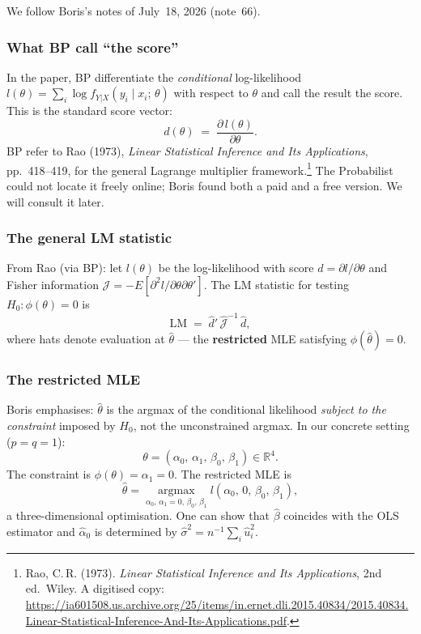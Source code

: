 \documentclass[a4paper,oneside,12pt]{extarticle}
\theoremstyle{plain}
\theoremstyle{definition}
\theoremstyle{remark}
\begin{document}
We follow Boris's notes of July~18, 2026 (note~66).

\subsubsection*{What BP call ``the score''}

In the paper, BP differentiate the \emph{conditional} log-likelihood
$l(\theta) = \sum_i \log f_{Y|X}(y_i \mid x_i;\,\theta)$ with
respect to $\theta$ and call the result the score.  This is the
standard score vector:
\[
  d(\theta) \;=\; \frac{\partial\, l(\theta)}{\partial\theta}.
\]
BP refer to Rao (1973), \emph{Linear Statistical Inference and Its
Applications}, pp.~418--419, for the general Lagrange multiplier
framework.\footnote{Rao, C.\,R. (1973). \emph{Linear Statistical
Inference and Its Applications}, 2nd ed.\ Wiley.  A digitised copy:
\url{https://ia601508.us.archive.org/25/items/in.ernet.dli.2015.40834/2015.40834.Linear-Statistical-Inference-And-Its-Applications.pdf}.}
The Probabilist could not locate it freely online; Boris found both a paid
and a free version.  We will consult it later.

\subsubsection*{The general LM statistic}

From Rao (via BP): let $l(\theta)$ be the log-likelihood with
score $d = \partial l/\partial\theta$ and Fisher information
$\mathcal{J} = -E[\partial^2 l/\partial\theta\partial\theta']$.
The LM statistic for testing $H_0: \phi(\theta) = 0$ is
\[
  \mathrm{LM} \;=\; \hat{d}'\,\hat{\mathcal{J}}^{-1}\,\hat{d},
\]
where hats denote evaluation at $\hat\theta$ — the
\textbf{restricted} MLE satisfying $\phi(\hat\theta) = 0$.

\subsubsection*{The restricted MLE}

Boris emphasises: $\hat\theta$ is the argmax of the conditional
likelihood \emph{subject to the constraint} imposed by $H_0$, not
the unconstrained argmax.  In our concrete setting ($p = q = 1$):
\[
  \theta = (\alpha_0,\,\alpha_1,\,\beta_0,\,\beta_1) \in \mathbb{R}^4.
\]
The constraint is $\phi(\theta) = \alpha_1 = 0$.  The restricted MLE is
\[
  \hat\theta
  = \operatorname*{argmax}_{\alpha_0,\,\alpha_1=0,\,\beta_0,\,\beta_1}
    l(\alpha_0,\, 0,\, \beta_0,\, \beta_1),
\]
a three-dimensional optimisation.  One can show that $\hat\beta$
coincides with the OLS estimator and $\hat\alpha_0$ is determined
by $\hat\sigma^2 = n^{-1}\sum_i \hat{u}_i^2$.
\end{document}
